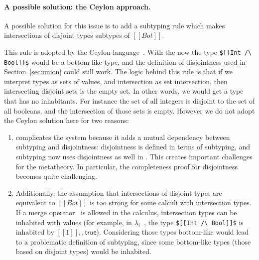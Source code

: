 \paragraph*{A possible solution: the Ceylon approach.}
A possible solution for this issue is to add a subtyping rule which makes intersections of
disjoint types subtypes of $[[Bot]]$.

\begin{center}
\end{center}

\noindent This rule is adopted by the Ceylon language~\citep{muehlboeck2018empowering}.
With the 
now the type \lstinline{$[[Int /\ Bool]]$} would be a bottom-like type, and the
definition of disjointness used in Section~\ref{sec:union} could still work.
The logic behind this rule is that if we interpret types as sets of values,
and intersection as set intersection, then intersecting disjoint sets
is the empty set. In other words, we would get a type that has no inhabitants.
For instance the set of all integers is disjoint to the set of all booleans,
and the intersection of those sets is empty.
However we do not adopt the Ceylon solution here for two reasons:

\begin{enumerate}

\item {} complicates the system because
  it adds a mutual dependency between subtyping and disjointness:
  disjointness is defined in terms of subtyping, and subtyping now
  uses disjointness as well in . This creates important
  challenges for the metatheory. In particular, the completeness proof
  for disjointness becomes quite challenging.

\item Additionally, the assumption that intersections of disjoint types
  are equivalent to $[[Bot]]$ is too strong for some calculi with intersection
  types. If a merge operator~\citep{reynolds1988preliminary} is allowed in the calculus,
  intersection types can be inhabited with values (for example, in $\lambda_i$~\cite{oliveira2016disjoint},
  the type \lstinline{$[[Int /\ Bool]]$} is inhabited by $[[1]] ,, \mathsf{true}$). Considering those
  types bottom-like would lead to a problematic definition of
  subtyping, since some bottom-like types (those based on disjoint types) would
  be inhabited.

\end{enumerate}

